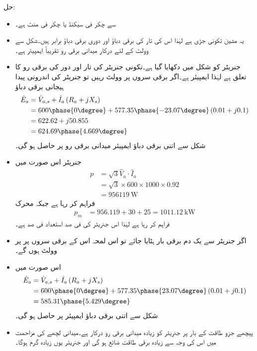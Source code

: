 حل:
\begin{itemize}
\item
{} سے  چکر فی سیکنڈ یا  چکر فی منٹ ہے۔
\item
یہ مشین تکونی جڑی ہے لہٰذا اس کی تار کی برقی دباؤ اور دوری برقی دباؤ برابر ہیں۔شکل  سے    وولٹ کے لئے درکار میدانی برقی رو تقریباً  ایمپیئر ہے۔
\item
جنریٹر کو شکل میں دکھایا گیا ہے۔تکونی جنریٹر کی تار اور دور کی برقی رو کا تعلق  ہے لہٰذا   ایمپیئر ہے۔اگر برقی سروں پر   وولٹ رہیں تو جنریٹر کی اندرونی پیدا ہیجانی  برقی دباؤ
\begin{align*}
\hat{E}_a&=\hat{V}_{a,s}+\hat{I}_a \left(R_a+j X_s \right)\\
&=600 \phase{0\degree} +577.35 \phase{-23.07\degree} \left(0.01+j 0.1 \right)\\
&=622.62+j 50.855\\
&=624.69\phase{4.669\degree}
\end{align*}
شکل سے اتنی برقی دباؤ  ایمپیئر میدانی برقی رو پر حاصل ہو گی۔
\item
جنریٹر اس صورت میں
\begin{align*}
p&=\sqrt{3} \hat{V}_{a} \cdot \hat{I}_a\\
&=\sqrt{3} \times 600 \times 1000 \times 0.92\\
&=\SI{956119}{\watt}
\end{align*}
فراہم کر رہا ہے جبکہ محرک 
\begin{align*}
p_m&=956.119+30+25=\SI{1011.12}{\kilo \watt}
\end{align*}
فراہم کر رہا ہے لہٰذا اس جنریٹر کی فی صد استعداد  فی صد ہے۔
\item
اگر جنریٹر سے یک دم برقی بار ہٹایا جائے تو اس لمحہ اس کے برقی سروں پر  پر  وولٹ ہوں گے۔
\item
اس صورت میں
\begin{align*}
\hat{E}_a&=\hat{V}_{a,s}+\hat{I}_a \left(R_a+j X_s \right)\\
&=600 \phase{0\degree} +577.35 \phase{23.07\degree} \left(0.01+j 0.1 \right)\\
&=585.31 \phase{5.429\degree}
\end{align*}
شکل  سے اتنی برقی دباؤ   ایمپیئر پر حاصل ہو گی۔
\item
پیچھے جزو طاقت کے بار پر جنریٹر کو زیادہ میدانی برقی رو درکار ہے۔میدانی لچھے کی مزاحمت میں اس کی وجہ سے زیادہ برقی طاقت ضائع ہو گی اور جنریٹر یوں زیادہ گرم ہوگا۔
\end{itemize}
